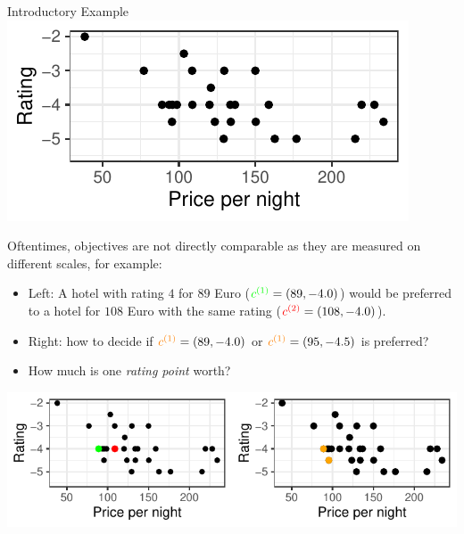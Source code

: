 \begin{frame}[allowframebreaks]{Introductory Example}
\centering \includegraphics[scale=1]{images/expedia-1-1}


\framebreak

Oftentimes, objectives are not directly comparable as they are measured on different scales, for example:

\begin{itemize}
    \item Left: A hotel with rating $4$ for $89$ Euro ($\textcolor{green}{c^{(1)}} = \left(89, - 4.0\right)$) would be preferred to a hotel for $108$ Euro with the same rating ($\textcolor{red}{c^{(2)}} = \left(108, - 4.0\right)$).
\item Right: how to decide if $\textcolor{orange}{c^{(1)}} = \left(89, - 4.0\right)$ or $\textcolor{orange}{c^{(1)}} = \left(95, - 4.5\right)$ is preferred?
\item How much is one \textit{rating point} worth?
\end{itemize}

\centering \includegraphics[scale=1]{images/expedia-2-1}

\end{frame}


